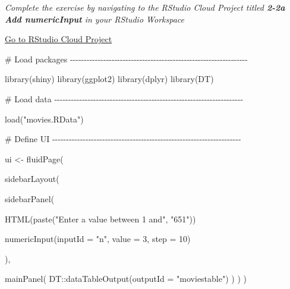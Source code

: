 \documentclass[
  letterpaper,
  DIV=11,
  numbers=noendperiod]{scrreprt}
\newenvironment{Shaded}{\begin{snugshade}}{\end{snugshade}}
\newcommand{\AttributeTok}[1]{\textcolor[rgb]{0.40,0.46,0.14}{#1}}
\newcommand{\CommentTok}[1]{\textcolor[rgb]{0.37,0.37,0.37}{#1}}
\newcommand{\DecValTok}[1]{\textcolor[rgb]{0.68,0.00,0.00}{#1}}
\newcommand{\FunctionTok}[1]{\textcolor[rgb]{0.28,0.35,0.67}{#1}}
\newcommand{\NormalTok}[1]{\textcolor[rgb]{0.00,0.46,0.62}{#1}}
\newcommand{\OtherTok}[1]{\textcolor[rgb]{0.00,0.46,0.62}{#1}}
\newcommand{\SpecialCharTok}[1]{\textcolor[rgb]{0.37,0.37,0.37}{#1}}
\newcommand{\StringTok}[1]{\textcolor[rgb]{0.13,0.47,0.30}{#1}}
\begin{document}
\emph{Complete the exercise by navigating to the RStudio Cloud Project
titled \textbf{2-2a Add numericInput} in your RStudio Workspace}

\href{https://rstudio.cloud/spaces/81721/join?access_code=I4VJaNsKfTqR3Td9hLP7E1nz8\%2FtMg6Xbw9Bgqumv}{
Go to RStudio Cloud Project}

\begin{Shaded}
\begin{Highlighting}[]
\CommentTok{\# Load packages {-}{-}{-}{-}{-}{-}{-}{-}{-}{-}{-}{-}{-}{-}{-}{-}{-}{-}{-}{-}{-}{-}{-}{-}{-}{-}{-}{-}{-}{-}{-}{-}{-}{-}{-}{-}{-}{-}{-}{-}{-}{-}{-}{-}{-}{-}{-}{-}{-}{-}{-}{-}{-}{-}{-}{-}{-}{-}{-}{-}{-}{-}{-}{-}}

\FunctionTok{library}\NormalTok{(shiny)}
\FunctionTok{library}\NormalTok{(ggplot2)}
\FunctionTok{library}\NormalTok{(dplyr)}
\FunctionTok{library}\NormalTok{(DT)}

\CommentTok{\# Load data {-}{-}{-}{-}{-}{-}{-}{-}{-}{-}{-}{-}{-}{-}{-}{-}{-}{-}{-}{-}{-}{-}{-}{-}{-}{-}{-}{-}{-}{-}{-}{-}{-}{-}{-}{-}{-}{-}{-}{-}{-}{-}{-}{-}{-}{-}{-}{-}{-}{-}{-}{-}{-}{-}{-}{-}{-}{-}{-}{-}{-}{-}{-}{-}{-}{-}{-}{-}}

\FunctionTok{load}\NormalTok{(}\StringTok{"movies.RData"}\NormalTok{)}

\CommentTok{\# Define UI {-}{-}{-}{-}{-}{-}{-}{-}{-}{-}{-}{-}{-}{-}{-}{-}{-}{-}{-}{-}{-}{-}{-}{-}{-}{-}{-}{-}{-}{-}{-}{-}{-}{-}{-}{-}{-}{-}{-}{-}{-}{-}{-}{-}{-}{-}{-}{-}{-}{-}{-}{-}{-}{-}{-}{-}{-}{-}{-}{-}{-}{-}{-}{-}{-}{-}{-}{-}}

\NormalTok{ui }\OtherTok{\textless{}{-}} \FunctionTok{fluidPage}\NormalTok{(}
  
  \FunctionTok{sidebarLayout}\NormalTok{(}
    
    \FunctionTok{sidebarPanel}\NormalTok{(}
      
      \FunctionTok{HTML}\NormalTok{(}\FunctionTok{paste}\NormalTok{(}\StringTok{"Enter a value between 1 and"}\NormalTok{, }\StringTok{"651"}\NormalTok{))}
      
      \FunctionTok{numericInput}\NormalTok{(}\AttributeTok{inputId =} \StringTok{"n"}\NormalTok{,}
                   \AttributeTok{value =} \DecValTok{3}\NormalTok{,}
                   \AttributeTok{step =} \DecValTok{10}\NormalTok{)}
      
\NormalTok{    ),}
    
    \FunctionTok{mainPanel}\NormalTok{(}
\NormalTok{      DT}\SpecialCharTok{::}\FunctionTok{dataTableOutput}\NormalTok{(}\AttributeTok{outputId =} \StringTok{"moviestable"}\NormalTok{)}
\NormalTok{    )}
\NormalTok{  )}
\NormalTok{)}


\end{Highlighting}
\end{Shaded}
\end{document}
